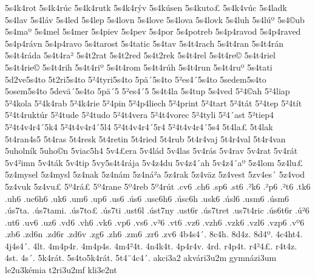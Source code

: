 {5s4k4rot
5s4k4r^^fac
5s4k4rutk
5s4k4r^^fdv
5s4k^^fasen
5s4kuto^^a3
5s4k4v^^fac
5s4ladk
5s4lav
5s4l^^e1v
5s4led
5s4lep
5s4lovn
5s4love
5s4lova
5s4lovk
5s4luh
5s4l^^fa^^ba
5s4^^a9ub
5s4ma^^ba
5s4mel
5s4mer
5s4piev
5s4pev
5s4por
5s4potreb
5s4p4ravod
5s4p4raved
5s4p4r^^e1vn
5s4p4ravo
5s4tarost
5s4tatic
5s4tav
5s4t4rach
5s4t4ran
5s4t4r^^e1n
5s4t4r^^e1da
5s4t4ra^^b2
5s4t2rat
5s4t2red
5s4t2rek
5s4t4rel
5s4t4re^^a9
5s4t4riel
5s4t4rie^^a9
5s4t4rih
5s4t4ri^^ba
5s4t4rom
5s4t4r^^fah
5s4t4run
5s4t4ru^^ba
5s4tati
5d2ve5s4to
5t2ri5s4to
5^^b24tyri5s4to
5p^^e4^^b45s4to
5^^b2es4^^b45s4to
5sedem5s4to
5osem5s4to
5dev^^e4^^b45s4to
5p^^e4^^b45
5^^b2es4^^b45
5s4t4la
5s4tup
5s4ved
5^^b24^^a9ah
5^^b24liap
5^^b24kola
5^^b24k4rab
5^^b24k4rie
5^^b24pin
5^^b24p4liech
5^^b24print
5^^b24tart
5^^b24t^^e1t
5^^b24tep
5^^b24t^^edt
5^^b24t4rukt^^far
5^^b24tude
5^^b24tudo
5^^b24t4vera
5^^b24t4vorec
5^^b24tyli
5^^b24^^b4ast
5^^b2tiep4
5^^b24t4v4r4^^b45k4
5^^b24t4v4r4^^b45l4
5^^b24t4v4r4^^b45r4
5^^b24t4v4r4^^b45s4
5t4la^^a3
5t4lak
5t4ran4s5
5t4ras
5t4resk
5t4retin
5t4ried
5t4rub
5t4r4vaj
5t4r4val
5t4r4van
5uholn^^edk
5uho^^a9n
5viac5h4
5v4^^a3era
5v4l^^e1d
5v4las
5v4r^^e1s
5v4rav
5v4rat
5v4r^^e1t
5v4^^b2imn
5v4t^^e1k
5v4tip
5vy5s4t4r^^e1ja
5v4z4du
5v4z4^^b4ah
5v4z4^^b4a^^ba
5z4lom
5z4lu^^a3
5z4mysel
5z4mysl
5z4nak
5z4n^^e1m
5z4n^^e1^^b2a
5z4rak
5z4v^^e4z
5z4vest
5zv4es^^b4
5z4vod
5z4vuk
5z4vu^^a3
5^^ba4r^^e1^^a3
5^^ba4rane
5^^ba4reb
5^^ba4r^^fat
.cv6
.ch6
.sp6
.st6
.^^b2k6
.^^b2p6
.^^b2t6
.tk6
.uh6
.uc6h6
.uk6
.um6
.up6
.us6
.^^fas6
.usc6h6
.^^fasc6h
.usk6
.^^fasl6
.usm6
.^^fasm6
.^^fas7ta.
.^^fas7tami.
.^^fas7to^^a3
.^^fas7ti
.ust6l
.^^fast7ny
.ust6r
.^^fas7tret
.us7t4ric
.^^fas6t6r
.^^fa^^b26
.ut6
.uv6
.uz6
.vd6
.vh6
.vk6
.vp6
.vs6
.v^^b26
.vt6
.vz6
.vzh6
.vzk6
.vzl6
.vzp6
.v^^ba6
.zb6
.zd6n
.zd6r
.zd6v
.zg6
.zh6
.zm6
.zr6
.zv6
4b4s4^^b4.
8c4h.
8d4z.
8d4^^ba.
4c4ht4.
4j4s4^^b4.
4lt.
4m4p4r.
4m4p4s.
4m4^^b24t.
4n4k4t.
4p4r4v.
4rd.
r4p4t.
r4^^b24^^a3.
r4t4z.
4st.
4s^^b4.
5k4r^^e1t.
5s4to5k4r^^e1t.
5t4^^a84c4^^b4.
akci3a2
akv^^e1ri3u2m
gymn^^e1zi3um
le2u3k^^e9mia
t2ri3u2mf
kli3e2nt
}
%
\endgroup
\endinput
